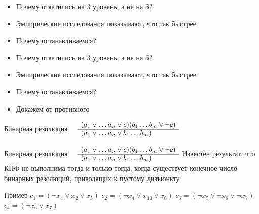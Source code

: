 \documentclass{beamer}
\begin{document}
\begin{frame}{}
\begin{itemize}
\item Почему откатились на 3 уровень, а не на 5?
\item Эмпирические исследования показывают, что так быстрее
\item Почему останавливаемся?
\end{itemize}
\end{frame}

\begin{frame}{}
\begin{itemize}
\item Почему откатились на 3 уровень, а не на 5?
\item Эмпирические исследования показывают, что так быстрее
\item Почему останавливаемся?
\item Докажем от противного
\end{itemize}
\end{frame}

\begin{frame}{Бинарная резолюция}
$\begin{array}{rl}
    & (a_1 \vee \dots a_n \vee c) (b_1 \dots b_m \vee \lnot c)\\
    \cline{2-2}
    & (a_1 \vee \dots a_n \vee b_1 \dots b_m)
\end{array}$
\end{frame}

\begin{frame}{Бинарная резолюция}
$\begin{array}{rl}
    & (a_1 \vee \dots a_n \vee c) (b_1 \dots b_m \vee \lnot c)\\
    \cline{2-2}
    & (a_1 \vee \dots a_n \vee b_1 \dots b_m)
\end{array}$\newline
Известен результат, что КНФ не выполнима тогда и только тогда, когда существует конечное число бинарных резолюций, приводящих к
пустому дизъюнкту
\end{frame}

\begin{frame}{Пример}
$c_1 = (\lnot x_4 \vee x_2 \vee x_5)$\newline
$c_2 = (\lnot x_4 \vee x_{10} \vee x_6)$\newline
$c_3 = (\lnot x_5 \vee \lnot x_6 \vee \lnot x_7)$\newline
$c_4 = (\lnot x_6 \vee x_7)$\newline
\end{frame}
\end{document}
